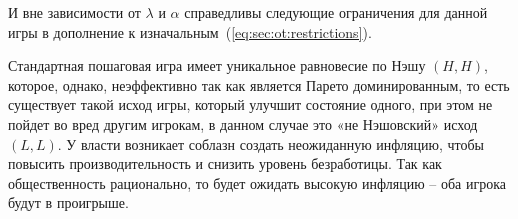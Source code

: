 И вне зависимости от $\lambda$ и  $\alpha$ справедливы следующие ограничения для данной игры в дополнение к изначальным~(\ref{eq:sec:ot:restrictions}).

Стандартная пошаговая игра имеет уникальное равновесие по Нэшу $(H,H)$,
которое, однако, неэффективно так как является Парето доминированным, то есть существует такой исход игры, который улучшит состояние одного, при этом не пойдет во вред другим игрокам, в данном случае это «не Нэшовский» исход $(L,L)$.  У власти возникает соблазн создать неожиданную инфляцию, чтобы повысить производительность и снизить уровень безработицы. Так как общественность рационально, то будет ожидать высокую инфляцию – оба игрока будут в проигрыше. 

